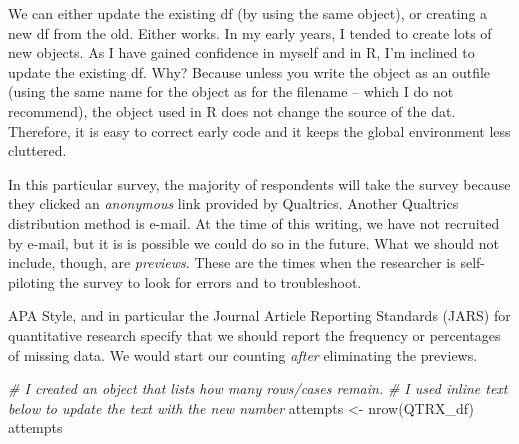 \documentclass[
  11pt,
]{book}
\newenvironment{Shaded}{\begin{snugshade}}{\end{snugshade}}
\newcommand{\CommentTok}[1]{\textcolor[rgb]{0.56,0.35,0.01}{\textit{#1}}}
\newcommand{\FunctionTok}[1]{\textcolor[rgb]{0.00,0.00,0.00}{#1}}
\newcommand{\NormalTok}[1]{#1}
\newcommand{\OtherTok}[1]{\textcolor[rgb]{0.56,0.35,0.01}{#1}}
\newcommand{\SpecialCharTok}[1]{\textcolor[rgb]{0.00,0.00,0.00}{#1}}
\newcommand{\StringTok}[1]{\textcolor[rgb]{0.31,0.60,0.02}{#1}}
\begin{document}
We can either update the existing df (by using the same object), or creating a new df from the old. Either works. In my early years, I tended to create lots of new objects. As I have gained confidence in myself and in R, I'm inclined to update the existing df. Why? Because unless you write the object as an outfile (using the same name for the object as for the filename -- which I do not recommend), the object used in R does not change the source of the dat. Therefore, it is easy to correct early code and it keeps the global environment less cluttered.

In this particular survey, the majority of respondents will take the survey because they clicked an \emph{anonymous} link provided by Qualtrics. Another Qualtrics distribution method is e-mail. At the time of this writing, we have not recruited by e-mail, but it is is possible we could do so in the future. What we should not include, though, are \emph{previews}. These are the times when the researcher is self-piloting the survey to look for errors and to troubleshoot.

\begin{Shaded}
\end{Shaded}

APA Style, and in particular the Journal Article Reporting Standards (JARS) for quantitative research specify that we should report the frequency or percentages of missing data. We would start our counting \emph{after} eliminating the previews.

\begin{Shaded}
\begin{Highlighting}[]
\CommentTok{\# I created an object that lists how many rows/cases remain.}
\CommentTok{\# I used inline text below to update the text with the new number}
\NormalTok{attempts }\OtherTok{\textless{}{-}} \FunctionTok{nrow}\NormalTok{(QTRX\_df)}
\NormalTok{attempts}
\end{Highlighting}
\end{Shaded}
\end{document}
